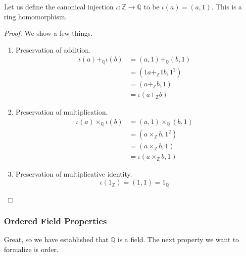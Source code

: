 \documentclass{article}
\begin{document}
      \begin{theorem}
        Let us define the canonical injection $\iota: \mathbb{Z} \rightarrow \mathbb{Q}$ to be $\iota(a) = (a, 1)$. This is a ring homomorphism. 
      \end{theorem}
      \begin{proof} 
        We show a few things. 
        \begin{enumerate}
          \item Preservation of addition. 
            \begin{align}
              \iota(a) +_{\mathbb{Q}} \iota(b) & = (a, 1) +_{\mathbb{Q}} (b, 1) \\
                                               & = (1a +_{\mathbb{Z}} 1b, 1^2) \\
                                               & = (a +_{\mathbb{Z}} b, 1) \\
                                               & = \iota(a +_{\mathbb{Z}} b) 
            \end{align}
          \item Preservation of multiplication. 
            \begin{align}
              \iota(a) \times_{\mathbb{Q}} \iota(b) & = (a, 1) \times_{\mathbb{Q}} (b, 1) \\
                                                    & = (a \times_{\mathbb{Z}} b, 1^2) \\
                                                    & = (a \times_{\mathbb{Z}} b, 1) \\
                                                    & = \iota(a \times_{\mathbb{Z}} b, 1)
            \end{align}
          \item Preservation of multiplicative identity. 
            \begin{equation}
              \iota(1_{\mathbb{Z}}) = (1, 1) = 1_{\mathbb{Q}}
            \end{equation}
        \end{enumerate}
      \end{proof} 

    \subsubsection{Ordered Field Properties} 

      Great, so we have established that $\mathbb{Q}$ is a field. The next property we want to formalize is order. 
\end{document}
